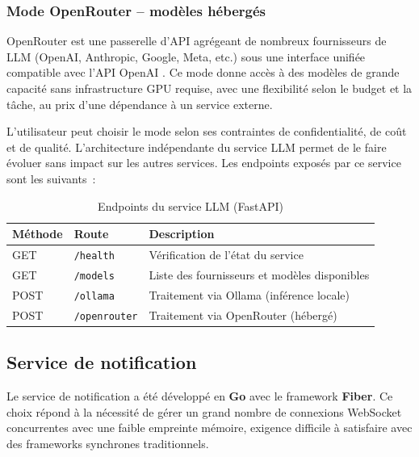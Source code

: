 \subsubsection*{Mode OpenRouter -- modèles hébergés}

OpenRouter est une passerelle d'API agrégeant de nombreux fournisseurs de LLM (OpenAI, Anthropic,
Google, Meta, etc.) sous une interface unifiée compatible avec l'API OpenAI
\parencite{openrouter2023}. Ce mode donne accès à des modèles de grande capacité sans
infrastructure GPU requise, avec une flexibilité selon le budget et la tâche, au prix d'une
dépendance à un service externe.

L'utilisateur peut choisir le mode selon ses contraintes de confidentialité, de coût et de
qualité. L'architecture indépendante du service LLM permet de le faire évoluer sans impact sur
les autres services. Les endpoints exposés par ce service sont les suivants~:

\begin{table}[H]
\centering
\small
\caption{Endpoints du service LLM (FastAPI)}
\label{tab:endpoints-llm}
\begin{tabular}{|>{\centering\arraybackslash}p{1.5cm}
                |>{\raggedright\arraybackslash}p{4.5cm}
                |>{\raggedright\arraybackslash}p{6.5cm}|}
\hline
\textbf{Méthode} & \textbf{Route} & \textbf{Description} \\
\hline
GET & \texttt{/health} & Vérification de l'état du service \\
\hline
GET & \texttt{/models} & Liste des fournisseurs et modèles disponibles \\
\hline
POST & \texttt{/ollama} & Traitement via Ollama (inférence locale) \\
\hline
POST & \texttt{/openrouter} & Traitement via OpenRouter (hébergé) \\
\hline
\end{tabular}
\end{table}

\subsection{Service de notification}

Le service de notification a été développé en \textbf{Go} avec le framework \textbf{Fiber}. Ce
choix répond à la nécessité de gérer un grand nombre de connexions WebSocket concurrentes avec
une faible empreinte mémoire, exigence difficile à satisfaire avec des frameworks synchrones
traditionnels.

